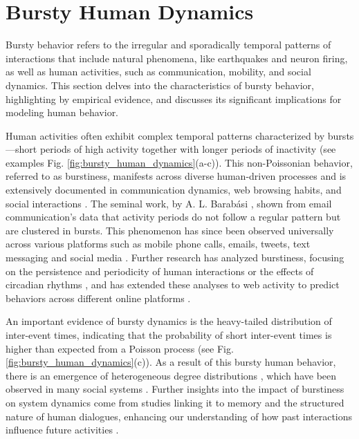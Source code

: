 \section{\label{sec: Bursty Human Dynamics} Bursty Human Dynamics}

Bursty behavior refers to the irregular and sporadically temporal patterns of interactions that include natural phenomena, like earthquakes and neuron firing, as well as human activities, such as communication, mobility, and social dynamics. This section delves into the characteristics of bursty behavior, highlighting by empirical evidence, and discusses its significant implications for modeling human behavior.

Human activities often exhibit complex temporal patterns characterized by bursts---short periods of high activity together with longer periods of inactivity (see examples Fig. \ref{fig:bursty_human_dynamics}(a-c)). This non-Poissonian behavior, referred to as burstiness, manifests across diverse human-driven processes and is extensively documented in communication dynamics, web browsing habits, and social interactions \cite{Barabasi2005Bursts, Vazquez2006Bursts}. The seminal work, by A. L. Barabási \cite{Barabasi2005Bursts}, shown from email communication's data that activity periods do not follow a regular pattern but are clustered in bursts. This phenomenon has since been observed universally across various platforms such as mobile phone calls, emails, tweets, text messaging and social media \cite{karsai-2011, Miritello2013Capacity,artime-2017,rybski-2012,zignani-2016,kumar-2020,iribarren-2009}. Further research has analyzed burstiness, focusing on the persistence and periodicity of human interactions \cite{Clauset2007Proximity} or the effects of circadian rhythms \cite{Jo2012Circadian}, and has extended these analyses to web activity to predict behaviors across different online platforms \cite{Radicchi2009WebActivity}.

An important evidence of bursty dynamics is the heavy-tailed distribution of inter-event times, indicating that the probability of short inter-event times is higher than expected from a Poisson process (see Fig. \ref{fig:bursty_human_dynamics}(c)). As a result of this bursty human behavior, there is an emergence of heterogeneous degree distributions \cite{Muchnik2013PowerLaw}, which have been observed in many social systems \cite{barabasi2009scale}. Further insights into the impact of burstiness on system dynamics come from studies linking it to memory and the structured nature of human dialogues, enhancing our understanding of how past interactions influence future activities \cite{karsai2012universal, Goh2008Burstiness, Eckmann2004Entropy}.

